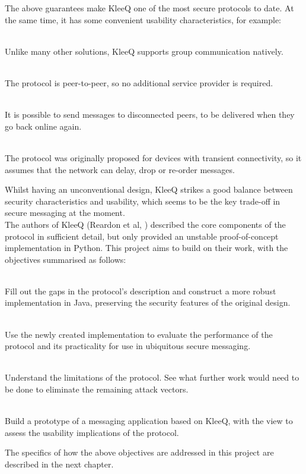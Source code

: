\documentclass[a4paper, 12pt]{report}
\begin{document}
The above guarantees make KleeQ one of the most secure protocols to date. At the same time, it has some convenient usability characteristics, for example:
\begin{description}[labelindent=0.5cm, leftmargin=1.3cm]
    \item[Support for groups] \hfill \\
        Unlike many other solutions, KleeQ supports group communication natively.
    \item[Peer-to-peer (P2P)] \hfill \\
        The protocol is peer-to-peer, so no additional service provider is required.
    \item[Support for asynchrony] \hfill \\
        It is possible to send messages to disconnected peers, to be delivered when they go back online again.
    \item[Unreliable network resilience] \hfill \\
        The protocol was originally proposed for devices with transient connectivity, so it assumes that the network can delay, drop or re-order messages.
\end{description}

Whilst having an unconventional design, KleeQ strikes a good balance between security characteristics and usability, which seems to be the key trade-off in secure messaging at the moment. \\

The authors of KleeQ (Reardon et al, \cite{reardon2007kleeq}) described the core components of the protocol in sufficient detail, but only provided an unstable proof-of-concept implementation in Python. This project aims to build on their work, with the objectives summarised as follows:
\begin{description}[labelindent=0.5cm, leftmargin=1.3cm]
    \item[Implementation] \hfill \\
        Fill out the gaps in the protocol's description and construct a more robust implementation in Java, preserving the security features of the original design.
        
    \item[Evaluation of Performance] \hfill \\
        Use the newly created implementation to evaluate the performance of the protocol and its practicality for use in ubiquitous secure messaging.
        
    \item[Evaluation of Security] \hfill \\
        Understand the limitations of the protocol. See what further work would need to be done to eliminate the remaining attack vectors.
        
    \item[Messenger Prototype] \hfill \\
        Build a prototype of a messaging application based on KleeQ, with the view to assess the usability implications of the protocol.
\end{description}
The specifics of how the above objectives are addressed in this project are described in the next chapter.
\end{document}
